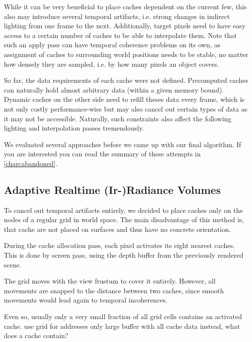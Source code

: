 \documentclass[thesis.tex]{subfiles}
\begin{document}
While it can be very beneficial to place caches dependent on the current few, this also may introduce several temporal artifacts, i.e. strong changes in indirect lighting from one frame to the next.
Additionally, target pixels need to have easy access to a certain number of caches to be able to interpolate them.
Note that such an apply pass can have temporal coherence problems on its own, as assignment of caches to surrounding world positions needs to be stable, no matter how densely they are sampled, i.e. by how many pixels an object covers.

So far, the data requirements of each cache were not defined.
Precomputed caches can naturally hold almost arbitrary data (within a given memory bound).
Dynamic caches on the other side need to refill theses data every frame, which is not only costly performance-wise but may also cancel out certain types of data as it may not be accessible. 
Naturally, such constraints also affect the following lighting and interpolation passes tremendously.

We evaluated several approaches before we came up with our final algorithm.
If you are interested you can read the summary of these attempts in \autoref{chap:abandoned}.

\subsection{Adaptive Realtime (Ir-)Radiance Volumes} 
To cancel out temporal artifacts entirely, we decided to place caches only on the nodes of a regular grid in world space.
The main disadvantage of this method is, that cache are not placed on surfaces and thus have no concrete orientation.

During the cache allocation pass, each pixel activates its eight nearest caches.
This is done by screen pass, using the depth buffer from the previously rendered scene.

The grid moves with the view frustum to cover it entirely.
However, all movements are snapped to the distance between two caches, since smooth movements would lead again to temporal incoherences.

Even so, usually only a very small fraction of all grid cells contains an activated cache.
use grid for addresses only
large buffer with all cache data instead,
what does a cache contain?
\end{document}
